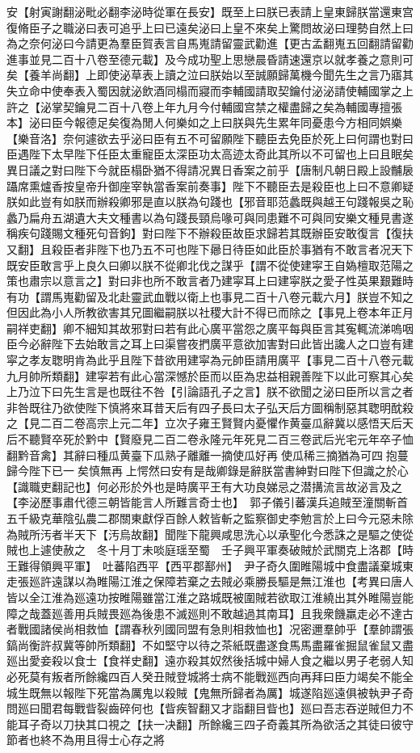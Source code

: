 安【射寅謝翻泌毗必翻李泌時從軍在長安】既至上曰朕已表請上皇東歸朕當還東宫復脩臣子之職泌曰表可追乎上曰已遠矣泌曰上皇不來矣上驚問故泌曰理勢自然上曰為之奈何泌曰今請更為羣臣賀表言自馬嵬請留靈武勸進【更古孟翻嵬五回翻請留勸進事並見二百十八卷至德元載】及今成功聖上思戀晨昏請速還京以就孝養之意則可矣【養羊尚翻】上即使泌草表上讀之泣曰朕始以至誠願歸萬機今聞先生之言乃寤其失立命中使奉表入蜀因就泌飲酒同榻而寢而李輔國請取契鑰付泌泌請使輔國掌之上許之【泌掌契鑰見二百十八卷上年九月今付輔國宫禁之權盡歸之矣為輔國專擅張本】泌曰臣今報德足矣復為閒人何樂如之上曰朕與先生累年同憂患今方相同娯樂【樂音洛】奈何遽欲去乎泌曰臣有五不可留願陛下聽臣去免臣於死上曰何謂也對曰臣遇陛下太早陛下任臣太重寵臣太深臣功太高迹太奇此其所以不可留也上曰且眠矣異日議之對曰陛下今就臣榻卧猶不得請况異日香案之前乎【唐制凡朝日殿上設黼扆躡席熏爐香按皇帝升御座宰執當香案前奏事】陛下不聽臣去是殺臣也上曰不意卿疑朕如此豈有如朕而辦殺卿邪是直以朕為句踐也【邪音耶范蠡既與越王句踐報吳之恥蠡乃扁舟五湖遺大夫文種書以為句踐長頸烏喙可與同患難不可與同安樂文種見書遂稱疾句踐賜文種死句音鉤】對曰陛下不辦殺臣故臣求歸若其既辦臣安敢復言【復扶又翻】且殺臣者非陛下也乃五不可也陛下曏日待臣如此臣於事猶有不敢言者况天下既安臣敢言乎上良久曰卿以朕不從卿北伐之謀乎【謂不從使建寜王自媯檀取范陽之策也肅宗以意言之】對曰非也所不敢言者乃建寜耳上曰建寜朕之愛子性英果艱難時有功【謂馬嵬勸留及北赴靈武血戰以衛上也事見二百十八卷元載六月】朕豈不知之但因此為小人所教欲害其兄圖繼嗣朕以社稷大計不得已而除之【事見上卷本年正月嗣祥吏翻】卿不細知其故邪對曰若有此心廣平當怨之廣平每與臣言其寃輒流涕嗚咽臣今必辭陛下去始敢言之耳上曰渠嘗夜捫廣平意欲加害對曰此皆出讒人之口豈有建寜之孝友聦明肯為此乎且陛下昔欲用建寜為元帥臣請用廣平【事見二百十八卷元載九月帥所類翻】建寜若有此心當深憾於臣而以臣為忠益相親善陛下以此可察其心矣上乃泣下曰先生言是也既往不咎【引論語孔子之言】朕不欲聞之泌曰臣所以言之者非咎既往乃欲使陛下慎將來耳昔天后有四子長曰太子弘天后方圖稱制惡其聦明酖殺之【見二百二卷高宗上元二年】立次子雍王賢賢内憂懼作黄臺瓜辭冀以感悟天后天后不聽賢卒死於黔中【賢廢見二百二卷永隆元年死見二百三卷武后光宅元年卒子恤翻黔音禽】其辭曰種瓜黄臺下瓜熟子離離一摘使瓜好再使瓜稀三摘猶為可四抱蔓歸今陛下已一矣慎無再上愕然曰安有是哉卿錄是辭朕當書紳對曰陛下但識之於心【識職吏翻記也】何必形於外也是時廣平王有大功良娣忌之潜搆流言故泌言及之【李泌歷事肅代德三朝皆能言人所難言奇士也】　郭子儀引蕃漢兵追賊至潼關斬首五千級克華陰弘農二郡關東獻俘百餘人敕皆斬之監察御史李勉言於上曰今元惡未除為賊所汚者半天下【汚烏故翻】聞陛下龍興咸思洗心以承聖化今悉誅之是驅之使從賊也上遽使赦之　冬十月丁未啖庭瑶至蜀　壬子興平軍奏破賊於武關克上洛郡【時王難得領興平軍】　吐蕃陷西平【西平郡鄯州】　尹子奇久圍睢陽城中食盡議棄城東走張廵許遠謀以為睢陽江淮之保障若棄之去賊必乘勝長驅是無江淮也【考異曰唐人皆以全江淮為廵遠功按睢陽雖當江淮之路城既被圍賊若欲取江淮繞出其外睢陽豈能障之哉蓋廵善用兵賊畏廵為後患不滅廵則不敢越過其南耳】且我衆饑羸走必不達古者戰國諸侯尚相救恤【謂春秋列國同盟有急則相救恤也】况密邇羣帥乎【羣帥謂張鎬尚衡許叔冀等帥所類翻】不如堅守以待之茶紙既盡遂食馬馬盡羅雀掘鼠雀鼠又盡廵出愛妾殺以食士【食祥史翻】遠亦殺其奴然後括城中婦人食之繼以男子老弱人知必死莫有叛者所餘纔四百人癸丑賊登城將士病不能戰廵西向再拜曰臣力竭矣不能全城生既無以報陛下死當為厲鬼以殺賊【鬼無所歸者為厲】城遂陷廵遠俱被執尹子奇問廵曰聞君每戰眥裂齒碎何也【眥疾智翻又才詣翻目眥也】廵曰吾志吞逆賊但力不能耳子奇以刀抉其口視之【扶一决翻】所餘纔三四子奇義其所為欲活之其徒曰彼守節者也終不為用且得士心存之將